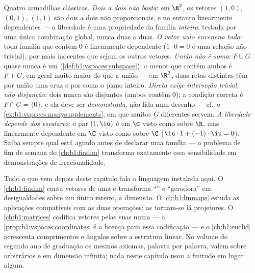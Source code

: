 \begin{remark}
\label{rem:b1:vspaces:pitfalls}
Quatro armadilhas clássicas.
\emph{Dois a dois não basta}: em $\R^2$, os vetores $(1,0)$,
$(0,1)$, $(1,1)$ são dois a dois não proporcionais, e no entanto
linearmente dependentes --- a liberdade é uma propriedade da família
\emph{inteira}, testada por uma única combinação global, nunca duas
a duas.
\emph{O vetor nulo envenena tudo}: toda família que contém $0$ é
linearmente dependente ($1\cdot 0 = 0$ é uma relação não trivial), por mais
inocentes que sejam os outros vetores.
\emph{União não é soma}: $F \cup G$ quase nunca é um 
(\cref{def:b1:vspaces:subspace}); o menor  que contém ambos é $F + G$, em geral
muito maior do que a união --- em $\R^2$, duas retas distintas têm
por união uma cruz e por soma o plano inteiro.
\emph{Direta exige interseção trivial, não disjunção}: dois
 nunca são disjuntos (ambos contêm $0$); a condição
correta é $F \cap G = \{0\}$, e ela deve ser \emph{demonstrada}, não lida num
desenho --- cf.\ o \cref{ex:b1:vspaces:manysupplements}, em que muitos $G$ diferentes servem.
\emph{A liberdade depende dos escalares}: o par $(1, \iu)$ é  em
$\C$ visto como  sobre $\R$, mas linearmente
dependente em $\C$ visto como  sobre $\C$ ($\iu\cdot 1 + (-1)\cdot\iu = 0$).
Saiba sempre qual  está agindo antes de declarar  uma
família --- o problema de fim de semana do \cref{ch:b1:findim} transforma
exatamente essa sensibilidade em demonstrações de irracionalidade.
\end{remark}

\begin{remark}
\label{rem:b1:vspaces:whereused}
Tudo o que vem depois deste capítulo fala a linguagem instalada
aqui. O \cref{ch:b1:findim} conta vetores de uma  e transforma ``'' e
``geradora'' em desigualdades sobre um único inteiro, a dimensão.
O \cref{ch:b1:linmaps} estuda as aplicações compatíveis com as duas operações; as
 tornam-se lá projetores. O \cref{ch:b1:matrices} codifica vetores
pelas suas  numa  --- a \cref{prop:b1:vspaces:coordinates} é a licença para essa
codificação --- e o \cref{ch:b1:euclid} acrescenta comprimentos e ângulos sobre a
estrutura linear. No volume do segundo ano de graduação os mesmos
axiomas, palavra por palavra, valem sobre  arbitrários e em
dimensão infinita; nada neste capítulo usou a finitude em lugar
algum.
\end{remark}

